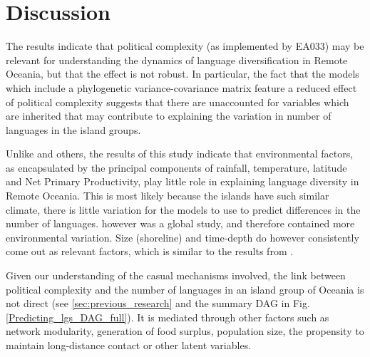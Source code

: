\documentclass[unnumsec,webpdf,modern,medium]{oup-authoring-template}
\begin{document}






\FloatBarrier
\section{Discussion}
\label{pol_study_discisson}
The results indicate that political complexity (as implemented by EA033) may be relevant for understanding the dynamics of language diversification in Remote Oceania, but that the effect is not robust. In particular, the fact that the models which include a phylogenetic variance-covariance matrix feature a reduced effect of political complexity suggests that there are unaccounted for variables which are inherited that may contribute to explaining the variation in number of languages in the island groups.

Unlike \citet{hua2019ecological} and others, the results of this study indicate that environmental factors, as encapsulated by the principal components of rainfall, temperature, latitude and Net Primary Productivity, play little role in explaining language diversity in Remote Oceania. This is most likely because the islands have such similar climate, there is little variation for the models to use to predict differences in the number of languages. \citet{hua2019ecological} however was a global study, and therefore contained more environmental variation. Size (shoreline) and time-depth do however consistently come out as relevant factors, which is similar to the results from \citet{gavin2012island}.

Given our understanding of the casual mechanisms involved,  the link between political complexity and the number of languages in an island group of Oceania is not direct (see \ref{sec:previous_research} and the summary DAG in Fig. \ref{Predicting_lgs_DAG_full}). It is mediated through other factors such as network modularity, generation of food surplus, population size, the propensity to maintain long-distance contact or other latent variables.
\end{document}
